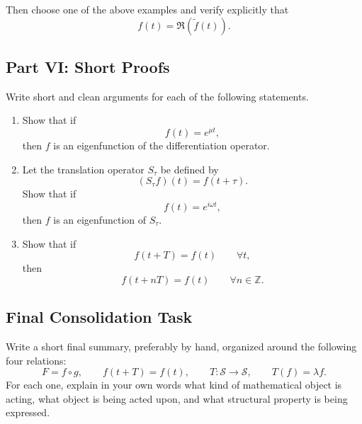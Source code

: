 \documentclass{article}
\begin{document}
	Then choose one of the above examples and verify explicitly that
	\[
	f(t)=\Re(\widetilde f(t)).
	\]
	
	\subsection*{Part VI: Short Proofs}
	
	Write short and clean arguments for each of the following statements.
	
	\begin{enumerate}
		\item Show that if
		\[
		f(t)=e^{\mu t},
		\]
		then \(f\) is an eigenfunction of the differentiation operator.
		
		\item Let the translation operator \(S_\tau\) be defined by
		\[
		(S_\tau f)(t)=f(t+\tau).
		\]
		Show that if
		\[
		f(t)=e^{i\omega t},
		\]
		then \(f\) is an eigenfunction of \(S_\tau\).
		
		\item Show that if
		\[
		f(t+T)=f(t)\qquad \forall t,
		\]
		then
		\[
		f(t+nT)=f(t)\qquad \forall n\in\mathbb{Z}.
		\]
	\end{enumerate}
	
	\subsection*{Final Consolidation Task}
	
	Write a short final summary, preferably by hand, organized around the following four relations:
	\[
	F=f\circ g,
	\qquad
	f(t+T)=f(t),
	\qquad
	T:\mathcal{S}\to\mathcal{S},
	\qquad
	T(f)=\lambda f.
	\]
	For each one, explain in your own words what kind of mathematical object is acting, what object is being acted upon, and what structural property is being expressed.
\end{document}
